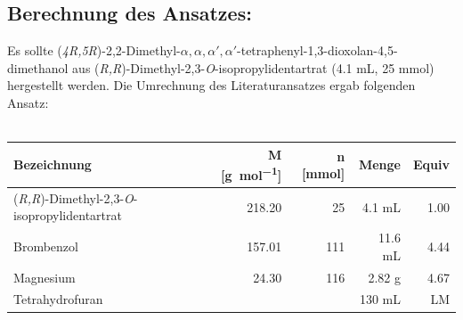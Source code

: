 \documentclass[12pt]{article}
\begin{document}
\begin{onehalfspace}

\section{Berechnung des Ansatzes: }
Es sollte (\textit{4R,5R})-2,2-Dimethyl-$\alpha ,\alpha ,\alpha ',\alpha '$-tetraphenyl-1,3-dioxolan-4,5-dimethanol aus (\textit{R,R})-Dimethyl-2,3-\textit{O}-isopropylidentartrat (4.1 \si{\milli\liter}, 25 mmol) hergestellt werden. Die Umrechnung des Literaturansatzes ergab folgenden Ansatz:\cite{vor}\\\\
\noindent
\begin{tabular}{lrrrr}
\toprule
\textbf{ Bezeichnung }&\textbf{M [\si{\gram\per\mol}]} & \textbf{ n [\si{\milli\mol}]} & \textbf{Menge} &  \textbf{Equiv}\\
\midrule
 (\textit{R,R})-Dimethyl-2,3-\textit{O}-isopropylidentartrat & 218.20 & 25  & 4.1 \si{\milli\liter} & 1.00 \\
Brombenzol  & 157.01   &  111  &  11.6 \si{\milli\liter} & 4.44 \\
 Magnesium    & 24.30   &  116  &  2.82 \si{\gram} & 4.67 \\
 Tetrahydrofuran &   &  & 130  \si{\milli\liter}& LM \\
\bottomrule
\end{tabular}\\


\end{onehalfspace}
\end{document}
